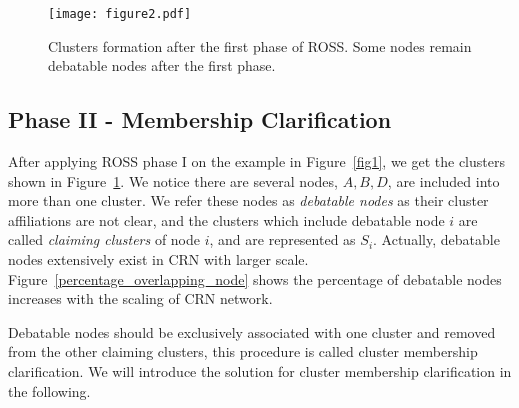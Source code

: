 


\begin{figure}[ht!]
  \centering
  \texttt{[image: figure2.pdf]}
  \caption{Clusters formation after the first phase of ROSS. Some nodes remain debatable nodes after the first phase.}
  \label{fig2}
\end{figure}


\subsection{Phase II - Membership Clarification}
After applying ROSS phase I on the example in Figure~\ref{fig1}, we get the clusters shown in Figure~\ref{fig2}.
We notice there are several nodes, \ie $A, B, D$, are included into more than one cluster. 
We refer these nodes as \textit{debatable nodes} as their cluster affiliations are not clear, and the clusters which include debatable node $i$ are called \textit{claiming clusters} of node $i$, and are represented as $S_i$.  
Actually, debatable nodes extensively exist in CRN with larger scale.
Figure~\ref{percentage_overlapping_node} shows the percentage of debatable nodes increases with the scaling of CRN network.

Debatable nodes should be exclusively associated with one cluster and removed from the other claiming clusters, this procedure is called cluster membership clarification.
We will introduce the solution for cluster membership clarification in the following.


